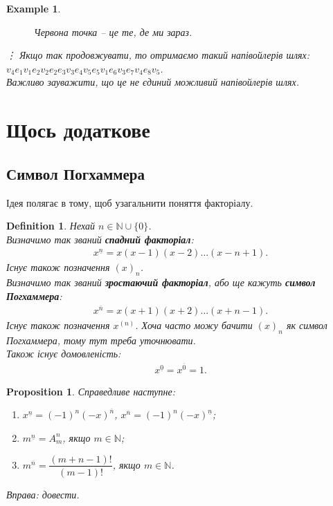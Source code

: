 \documentclass[a4paper, 14pt]{extarticle}
\theoremstyle{theoremdd}
\theoremstyle{theoremdd}
\newtheorem{definition}[theorem]{Definition}
\theoremstyle{theoremdd}
\theoremstyle{theoremdd}
\theoremstyle{theoremdd}
\newtheorem{example}[theorem]{Example}
\theoremstyle{theoremdd}
\theoremstyle{theoremdd}
\theoremstyle{theoremdd}
\theoremstyle{theoremdd}
\newtheorem{proposition}[theorem]{Proposition}
\theoremstyle{theoremdd}
\theoremstyle{theoremdd}
\theoremstyle{theoremdd}
\theoremstyle{theoremdd}
\theoremstyle{theoremdd}
\theoremstyle{theoremdd}
\begin{document}
\begin{example}
\begin{figure}[H]
\caption*{Червона точка -- це те, де ми зараз.}
\end{figure}
\vdots 
Якщо так продовжувати, то отримаємо такий напівойлерів шлях:\\
$v_4e_1v_1e_2v_2e_2e_3v_3e_4v_5e_5v_1e_6v_3e_7v_4e_8v_5$.\\
Важливо зауважити, що це не єдиний можливий напівойлерів шлях.
\end{example}
\newpage

\section{Щось додаткове}
\subsection{Символ Погхаммера}
Ідея полягає в тому, щоб узагальнити поняття факторіалу.

\begin{definition}
Нехай $n \in \mathbb{N} \cup \{0\}$.\\
Визначимо так званий \textbf{спадний факторіал}:
\begin{align*}
x^{\underline{n}} = x (x-1) (x-2) \dots (x-n+1).
\end{align*}
Існує також позначення $(x)_n$.\\
Визначимо так званий \textbf{зростаючий факторіал}, або ще кажуть \textbf{символ Погхаммера}:
\begin{align*}
x^{\overline{n}} = x(x+1)(x+2) \dots (x+n-1).
\end{align*}
Існує також позначення $x^{(n)}$. Хоча часто можу бачити $(x)_n$ як символ Погхаммера, тому тут треба уточнювати.
\bigskip \\
Також існує домовленість:
\begin{align*}
x^{\underline{0}} = x^{\overline{0}} = 1.
\end{align*}
\end{definition}

\begin{proposition}
Справедливе наступне:
\begin{enumerate}[nosep,wide=0pt,label={\arabic*)}]
\item $x^{\underline{n}} = (-1)^n (-x)^{\overline{n}}$, \qquad $x^{\overline{n}} = (-1)^n (-x)^{\underline{n}}$;
\item $m^{\underline{n}} = A_{m}^n$, якщо $m \in \mathbb{N}$;
\item $m^{\overline{n}} = \dfrac{(m+n-1)!}{(m-1)!}$, якщо $m \in \mathbb{N}$.
\end{enumerate}
\textit{Вправа: довести}.
\end{proposition}
\end{document}
